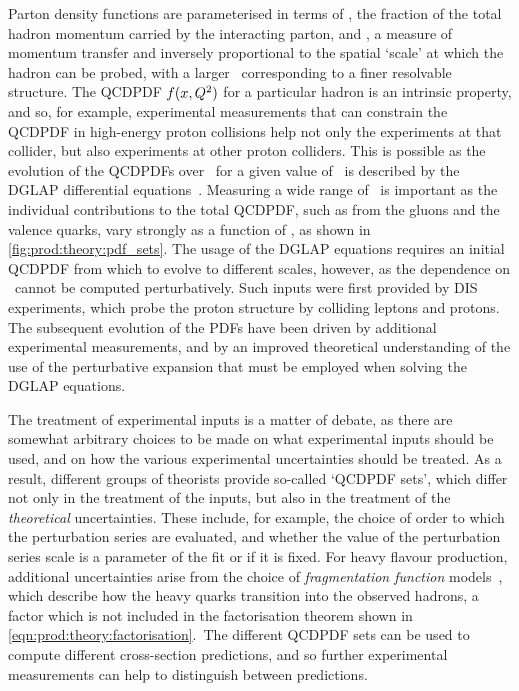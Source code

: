Parton density functions are parameterised in terms of \bjorkenx, the fraction 
of the total hadron momentum carried by the interacting parton, and 
\pdfqsquared, a measure of momentum transfer and inversely proportional to the 
spatial `scale' at which the hadron can be probed, with a larger \pdfqsquared\ 
corresponding to a finer resolvable structure.
The \ac{QCDPDF} $f(x, Q^{2})$ for a particular hadron is an 
intrinsic property, and so, for example, experimental measurements that can 
constrain the \ac{QCDPDF} in high-energy proton collisions help not only the 
experiments at that collider, but also experiments at other proton colliders.
This is possible as the evolution of the \acp{QCDPDF} over \pdfqsquared\ for a 
given value of \bjorkenx\ is described by the \ac{DGLAP} differential 
equations~\cite{Gribov:1972ri,Dokshitzer:1977sg,Altarelli:1977zs}.
Measuring a wide range of \bjorkenx\ is important as the individual 
contributions to the total \ac{QCDPDF}, such as from the gluons and the valence 
quarks, vary strongly as a function of \bjorkenx, as shown in 
\cref{fig:prod:theory:pdf_sets}.
The usage of the \ac{DGLAP} equations requires an initial \ac{QCDPDF} from 
which to evolve to different scales, however, as the dependence on \bjorkenx\ 
cannot be computed perturbatively.
Such inputs were first provided by \ac{DIS} experiments, which probe the proton 
structure by colliding leptons and protons.
The subsequent evolution of the \acp{PDF} have been driven by additional 
experimental measurements, and by an improved theoretical understanding of the 
use of the perturbative expansion that must be employed when solving the 
\ac{DGLAP} equations.

The treatment of experimental inputs is a matter of debate, as there are 
somewhat arbitrary choices to be made on what experimental inputs should be 
used, and on how the various experimental uncertainties should be treated.
As a result, different groups of theorists provide so-called `\ac{QCDPDF} 
sets', which differ not only in the treatment of the inputs, but also in the 
treatment of the \emph{theoretical} uncertainties.
These include, for example, the choice of order to which the perturbation 
series are evaluated, and whether the value of the perturbation series scale is 
a parameter of the fit or if it is fixed.
For heavy flavour production, additional uncertainties arise from the choice of 
\emph{fragmentation function} models~\cite{Kneesch:2007ey}, which describe how 
the heavy quarks transition into the observed hadrons, a factor which is not 
included in the factorisation theorem shown in 
\cref{eqn:prod:theory:factorisation}.\footnotemark\
The different \ac{QCDPDF} sets can be used to compute different cross-section 
predictions, and so further experimental measurements can help to distinguish 
between predictions.

